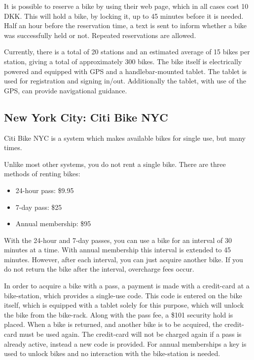 It is possible to reserve a bike by using their web page, which in all cases cost 10 DKK.
This will hold a bike, by locking it, up to 45 minutes before it is needed.
Half an hour before the reservation time, a text is sent to inform whether a bike was successfully held or not.
Repeated reservations are allowed.

Currently, there is a total of 20 stations and an estimated average of 15 bikes per station, giving a total of approximately 300 bikes.
The bike itself is electrically powered and equipped with GPS and a handlebar-mounted tablet.
The tablet is used for registration and signing in/out.
Additionally the tablet, with use of the GPS, can provide navigational guidance.

\subsection{New York City: Citi Bike NYC}
Citi Bike NYC\cite{nyc_citibike} is a system which makes available bikes for single use, but many times.

Unlike most other systems, you do not rent a single bike.
There are three methods of renting bikes:

\begin{itemize}
\item 24-hour pass: \$9.95
\item 7-day pass: \$25
\item Annual membership: \$95
\end{itemize}

With the 24-hour and 7-day passes, you can use a bike for an interval of 30 minutes at a time.
With annual membership this interval is extended to 45 minutes.
However, after each interval, you can just acquire another bike.
If you do not return the bike after the interval, overcharge fees occur.

In order to acquire a bike with a pass, a payment is made with a credit-card at a bike-station, which provides a single-use code.
This code is entered on the bike itself, which is equipped with a tablet solely for this purpose, which will unlock the bike from the bike-rack.
Along with the pass fee, a \$101 security hold is placed.
When a bike is returned, and another bike is to be acquired, the credit-card must be used again.
The credit-card will not be charged again if a pass is already active, instead a new code is provided.
For annual memberships a key is used to unlock bikes and no interaction with the bike-station is needed.

